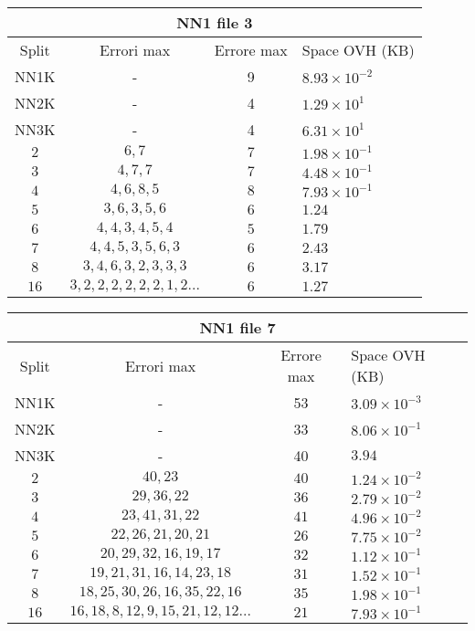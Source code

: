 \documentclass[]{article}
\begin{document}
	\begin{center}
		\begin{tabular}{|c | c | c | l|}
		\hline
		\multicolumn{4}{c}{NN1 file 3} \\
			\hline
			Split & Errori max & Errore max & Space OVH (KB) \\ \hline
			 NN1K & - & 9 & $8.93 \times 10^{-2}$\\ 
			 NN2K & - & 4 & $1.29\times 10^{1}$ \\
			 NN3K & - & 4 &  $6.31\times 10^{1}$ \\
			 \hline
			 $2$ & $6, 7$ & $7$ & $1.98\times 10^{-1}$ \\ 
			 $3$ & $4, 7, 7$ & $7$ & $4.48\times 10^{-1}$ \\ 
			 $4$ & $4, 6, 8, 5$ & $8$ & $7.93\times 10^{-1}$ \\ 
			 $5$ & $3, 6, 3, 5, 6$ & $6$ & $1.24$ \\ 
			 $6$ & $4, 4, 3, 4, 5, 4$ & $5$ & $1.79$ \\ 
			 $7$ & $4, 4, 5, 3, 5, 6, 3$ & $6$ & $2.43$ \\ 
			 $8$ & $3, 4, 6, 3, 2, 3, 3, 3$ & $6$ & $3.17$ \\
			 $16$ & $3, 2, 2, 2, 2, 2, 2, 1, 2...$ & $6$ & $1.27$ \\
			\hline  
	
		\end{tabular}
		
		\vspace*{0.5 cm}
	

	
		\begin{tabular}{| c | c | c | l |}
		\hline
		\multicolumn{4}{c}{NN1 file 7} \\
		\hline
		Split & Errori max & Errore max & Space OVH (KB) \\ \hline
		NN1K & - & 53 & $3.09 \times 10^{-3}$ \\ 
		NN2K & - & 33 & $8.06 \times 10^{-1}$\\
		NN3K & - & 40 & $3.94$\\
		\hline
		$2$ & $40, 23$ & $40$ & $1.24\times 10^{-2}$ \\ 
		$3$ & $29, 36, 22$ & $36$ & $2.79\times 10^{-2}$ \\ 
		$4$ & $23, 41, 31, 22$ & $41$ & $4.96\times 10^{-2}$ \\ 
		$5$ & $22, 26, 21, 20, 21$ & $26$ & $7.75 \times 10^{-2}$ \\ 
		$6$ & $20, 29, 32, 16, 19, 17$ & $32$ & $1.12\times 10^{-1}$ \\ 
		$7$ & $19, 21, 31, 16, 14, 23, 18$ & $31$ & $1.52\times 10^{-1}$ \\ 
		$8$ & $18, 25, 30, 26, 16, 35, 22, 16$ & $35$ & $1.98\times 10^{-1}$ \\
		$16$ & $16, 18, 8, 12, 9, 15, 21, 12, 12...$ & $21$ & $7.93\times 10^{-1}$ \\ 
		

\end{tabular}
\end{center}
\end{document}
